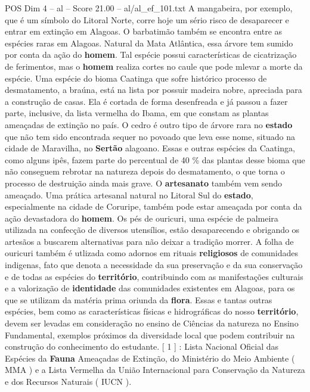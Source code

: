 \begin{textsample}{POS Dim 4 – al – Score 21.00 – al/al\_ef\_101.txt}
A mangabeira, por exemplo, que é um símbolo do Litoral Norte, corre hoje um sério risco de desaparecer e entrar em extinção em Alagoas.
O barbatimão também se encontra entre as espécies raras em Alagoas.
Natural da Mata Atlântica, essa árvore tem sumido por conta da ação do \textbf{homem}.
Tal espécie possui características de cicatrização de ferimentos, mas o \textbf{homem} realiza cortes no caule que pode mlevar a morte da espécie.
Uma espécie do bioma Caatinga que sofre histórico processo de desmatamento, a braúna, está na lista por possuir madeira nobre, apreciada para a construção de casas.
Ela é cortada de forma desenfreada e já passou a fazer parte, inclusive, da lista vermelha do Ibama, em que constam as plantas ameaçadas de extinção no país.
O cedro é outro tipo de árvore rara no \textbf{estado} que não tem sido encontrada sequer no povoado que leva esse nome, situado na cidade de Maravilha, no \textbf{Sertão} alagoano.
Essas e outras espécies da Caatinga, como alguns ipês, fazem parte do percentual de 40 \% das plantas desse bioma que não conseguem rebrotar na natureza depois do desmatamento, o que torna o processo de destruição ainda mais grave.
O \textbf{artesanato} também vem sendo ameaçado.
Uma prática artesanal natural no Litoral Sul do \textbf{estado}, especialmente na cidade de Coruripe, também pode estar ameaçada por conta da ação devastadora do \textbf{homem}.
Os pés de ouricuri, uma espécie de palmeira utilizada na confecção de diversos utensílios, estão desaparecendo e obrigando os artesãos a buscarem alternativas para não deixar a tradição morrer.
A folha de ouricuri também é utlizada como adornos em rituais \textbf{religiosos} de comunidades indigenas, fato que denota a necessidade da sua preservação e da sua conservação e de todas as espécies do \textbf{território}, contribuindo com as manifestações culturais e a valorização de \textbf{identidade} das comunidades existentes em Alagoas, para os que se utilizam da matéria prima oriunda da \textbf{flora}.
Essas e tantas outras espécies, bem como as características físicas e hidrográficas do nosso \textbf{território}, devem ser levadas em consideração no ensino de Ciências da natureza no Ensino Fundamental, exemplos próximos da diversidade local que podem contribuir na construção do conhecimento do estudante. [ 1 ] : Lista Nacional Oficial das Espécies da \textbf{Fauna} Ameaçadas de Extinção, do Ministério do Meio Ambiente ( MMA ) e a Lista Vermelha da União Internacional para Conservação da Natureza e dos Recursos Naturais ( IUCN ).

\end{textsample}
